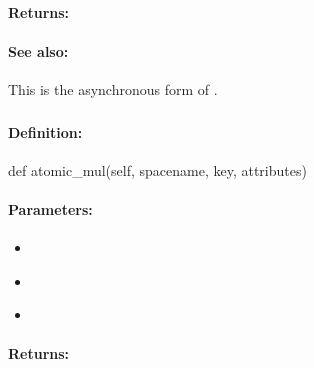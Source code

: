 \paragraph{Returns:}


\paragraph{See also:}  This is the asynchronous form of .

\pagebreak
\subsubsection{}
\label{api:python:atomic_mul}


\paragraph{Definition:}
\begin{pythoncode}
def atomic_mul(self, spacename, key, attributes)
\end{pythoncode}

\paragraph{Parameters:}
\begin{itemize}[noitemsep]
\item {}\\

\item {}\\

\item {}\\

\end{itemize}

\paragraph{Returns:}


\pagebreak
\subsubsection{}
\label{api:python:async_atomic_mul}


